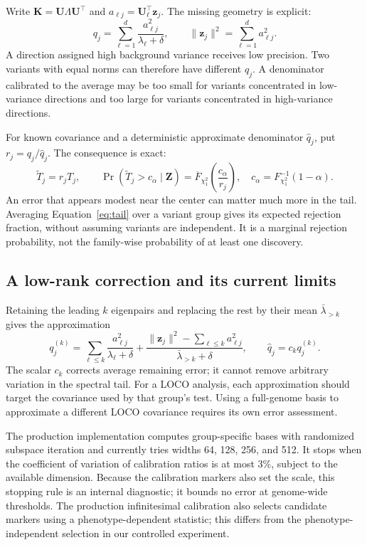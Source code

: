 \documentclass[11pt]{article}
\newcommand{\z}{\mathbf{z}}
\newcommand{\K}{\mathbf{K}}
\newcommand{\U}{\mathbf{U}}
\begin{document}
Write $\K=\U\Lambda\U^\top$ and
$a_{\ell j}=\U_\ell^\top\z_j$. The missing geometry is explicit:
\begin{equation}
 q_j=\sum_{\ell=1}^{d}\frac{a_{\ell j}^2}{\lambda_\ell+\delta},
 \qquad
 \|\z_j\|^2=\sum_{\ell=1}^{d}a_{\ell j}^2.
 \label{eq:spectrum}
\end{equation}
A direction assigned high background variance receives low precision.
Two variants with equal norms can therefore have different $q_j$.
A denominator calibrated to the average may be too small for variants
concentrated in low-variance directions and too large for variants
concentrated in high-variance directions.

For known covariance and a deterministic approximate denominator
$\widehat q_j$, put $r_j=q_j/\widehat q_j$. The consequence is exact:
\begin{equation}
 \widetilde T_j=r_j T_j,\qquad
 \Pr(\widetilde T_j>c_\alpha\mid\mathbf Z)
 =\overline F_{\chi^2_1}\!\left(\frac{c_\alpha}{r_j}\right),
 \quad c_\alpha=F^{-1}_{\chi^2_1}(1-\alpha).
 \label{eq:tail}
\end{equation}
An error that appears modest near the center can matter much more in
the tail. Averaging Equation~\eqref{eq:tail} over a variant group gives
its expected rejection fraction, without assuming variants are
independent. It is a marginal rejection probability, not the
family-wise probability of at least one discovery.

\subsection{A low-rank correction and its current limits}
\label{sec:spectral}

Retaining the leading $k$ eigenpairs and replacing the rest by their mean
$\bar\lambda_{>k}$ gives the approximation
\begin{equation}
 q_j^{(k)}=\sum_{\ell\leq k}\frac{a_{\ell j}^2}{\lambda_\ell+\delta}
 +\frac{\|\z_j\|^2-\sum_{\ell\leq k}a_{\ell j}^2}
       {\bar\lambda_{>k}+\delta},\qquad
 \widehat q_j=c_k q_j^{(k)}.
 \label{eq:spectral}
\end{equation}
The scalar $c_k$ corrects average remaining error; it cannot remove
arbitrary variation in the spectral tail. For a LOCO analysis, each
approximation should target the covariance used by that group's test.
Using a full-genome basis to approximate a different LOCO covariance
requires its own error assessment.

The production implementation computes group-specific bases with
randomized subspace iteration \citep{halko2011} and currently tries widths
64, 128, 256, and 512. It stops when the coefficient of variation of
calibration ratios is at most 3\%, subject to the available dimension.
Because the calibration markers also set the scale, this stopping
rule is an internal diagnostic; it bounds no error at genome-wide
thresholds. The production
infinitesimal calibration also selects candidate markers using a
phenotype-dependent statistic; this differs from the phenotype-independent
selection in our controlled experiment.
\end{document}
